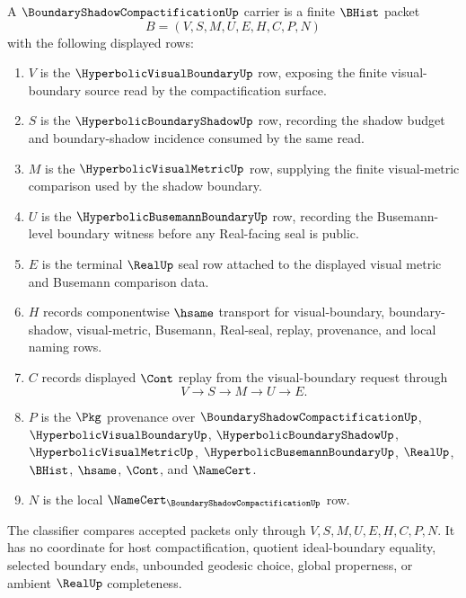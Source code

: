 \begin{definition}
\label{def:boundary-shadow-compactification-carrier}
A $\BoundaryShadowCompactificationUp$ carrier is a finite $\BHist$ packet
$$
B=(V,S,M,U,E,H,C,P,N)
$$
with the following displayed rows:
\begin{enumerate}
\item $V$ is the $\HyperbolicVisualBoundaryUp$ row, exposing the finite visual-boundary source read by the compactification surface.
\item $S$ is the $\HyperbolicBoundaryShadowUp$ row, recording the shadow budget and boundary-shadow incidence consumed by the same read.
\item $M$ is the $\HyperbolicVisualMetricUp$ row, supplying the finite visual-metric comparison used by the shadow boundary.
\item $U$ is the $\HyperbolicBusemannBoundaryUp$ row, recording the Busemann-level boundary witness before any Real-facing seal is public.
\item $E$ is the terminal $\RealUp$ seal row attached to the displayed visual metric and Busemann comparison data.
\item $H$ records componentwise $\hsame$ transport for visual-boundary, boundary-shadow, visual-metric, Busemann, Real-seal, replay, provenance, and local naming rows.
\item $C$ records displayed $\Cont$ replay from the visual-boundary request through
$$
V\longrightarrow S\longrightarrow M\longrightarrow U\longrightarrow E .
$$
\item $P$ is the $\Pkg$ provenance over $\BoundaryShadowCompactificationUp$, $\HyperbolicVisualBoundaryUp$, $\HyperbolicBoundaryShadowUp$, $\HyperbolicVisualMetricUp$, $\HyperbolicBusemannBoundaryUp$, $\RealUp$, $\BHist$, $\hsame$, $\Cont$, and $\NameCert$.
\item $N$ is the local $\NameCert_{\BoundaryShadowCompactificationUp}$ row.
\end{enumerate}
The classifier compares accepted packets only through $V,S,M,U,E,H,C,P,N$. It has no coordinate for host compactification, quotient ideal-boundary equality, selected boundary ends, unbounded geodesic choice, global properness, or ambient $\RealUp$ completeness.
\end{definition}


